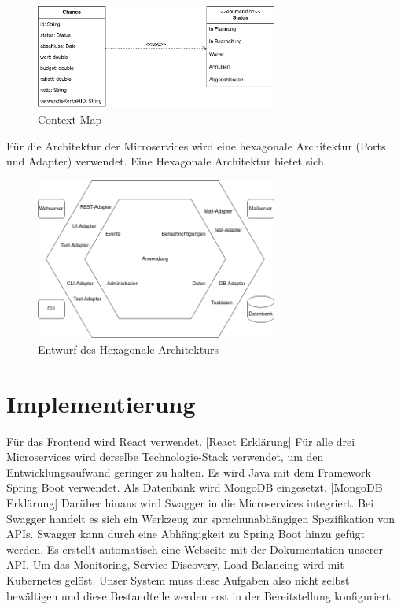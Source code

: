 \begin{figure}[H] 
    \centering
    \includegraphics[width=0.71\textwidth]{figures/ChanceUMLDiagram.png}
    \caption{Context Map}
    \label{fig:CRMENTWURF}
\end{figure} 

Für die Architektur der Microservices wird eine hexagonale Architektur (Ports und Adapter) verwendet. Eine Hexagonale Architektur bietet sich 

\begin{figure}[H] 
    \centering
    \includegraphics[width=0.71\textwidth]{figures/HexagonalDesignConcept.png}
    \caption{Entwurf des \acp{Hexagonale Architektur}}
    \label{fig:CRMENTWURF}
\end{figure}

\clearpage
\section{Implementierung}


Für das Frontend wird React verwendet. [React Erklärung]
Für alle drei Microservices wird derselbe Technologie-Stack verwendet, um den Entwicklungsaufwand geringer zu halten. Es wird Java mit dem Framework Spring Boot verwendet. Als Datenbank wird MongoDB eingesetzt. [MongoDB Erklärung] Darüber hinaus wird Swagger in die Microservices integriert. Bei Swagger handelt es sich ein Werkzeug zur sprachunabhängigen Spezifikation von APIs. Swagger kann durch eine Abhängigkeit zu Spring Boot hinzu gefügt werden. Es erstellt automatisch eine Webseite mit der Dokumentation unserer API. Um das Monitoring, Service Discovery, Load Balancing wird mit Kubernetes gelöst. Unser System muss diese Aufgaben also nicht selbst bewältigen und diese Bestandteile werden erst in der Bereitstellung konfiguriert.


